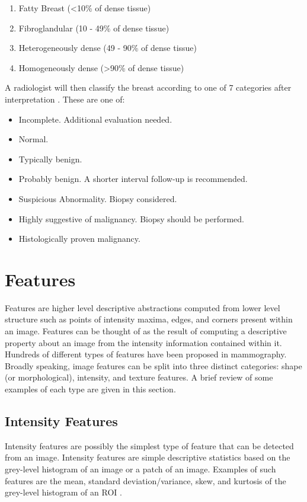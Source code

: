 \begin{enumerate}
	\item Fatty Breast (\textless10\% of dense tissue)
	\item Fibroglandular (10 - 49\% of dense tissue)
	\item Heterogeneously dense (49 - 90\% of dense tissue)
	\item Homogeneously dense (\textgreater 90\% of dense tissue)
\end{enumerate}

A radiologist will then classify the breast according to one of 7 categories after interpretation \cite{balleyguier2007birads}. These are one of:

\begin{itemize}
	\item Incomplete. Additional evaluation needed.
	\item Normal. 
	\item Typically benign.
	\item Probably benign. A shorter interval follow-up is recommended.
	\item Suspicious Abnormality. Biopsy considered.
	\item Highly suggestive of malignancy. Biopsy should be performed.
	\item Histologically proven malignancy.
\end{itemize}

\section{Features}
\label{sec:features}
Features are higher level descriptive abstractions computed from lower level structure such as points of intensity maxima, edges, and corners present within an image. Features can be thought of as the result of computing a descriptive property about an image from the intensity information contained within it. Hundreds of different types of features have been proposed in mammography. Broadly speaking, image features can be split into three distinct categories: shape (or morphological), intensity, and texture features. A brief review of some examples of each type are given in this section.


\subsection{Intensity Features}
Intensity features are possibly the simplest type of feature that can be detected from an image. Intensity features are simple descriptive statistics based on the grey-level histogram of an image or a patch of an image. Examples of such features are the mean, standard deviation/variance, skew, and kurtosis of the grey-level histogram of an ROI \cite{cheng2006approaches, christoyianni2000fast}.


